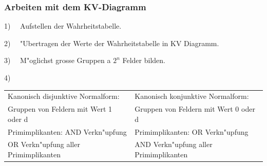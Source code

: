 	\subsubsection{Arbeiten mit dem KV-Diagramm}
		\begin{compactitem}
			\item 1) \ \ Aufstellen der Wahrheitstabelle.\\
			\item 2) \ \ "Ubertragen der Werte der Wahrheitstabelle in KV Diagramm.\\
			\item 3) \ \ M"oglichst grosse Gruppen a $2^n$ Felder bilden.\\
			\item 4)
				\begin{tabular}{ll}
					Kanonisch disjunktive Normalform: & Kanonisch konjunktive Normalform: \\
					Gruppen von Feldern mit Wert 1 oder d & Gruppen von Feldern mit Wert 0 oder d\\
					Primimplikanten: AND Verkn"upfung & Primimplikanten: OR Verkn"upfung\\
					OR Verkn"upfung aller Primimplikanten & AND Verkn"upfung aller Primimplikanten\\
				\end{tabular}
		\end{compactitem}